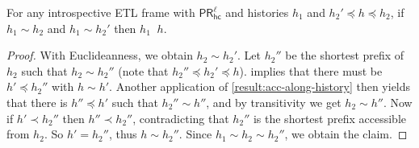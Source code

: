 \documentclass{article}
\newcommand{\PRhcl}{\ensuremath{\mathsf{PR_{hc}^\ell}}\xspace}
\newcommand{\acc}{\sim}
\DeclareMathOperator{\accSfive}{\dot\acc}
\newcounter{#1}
\begin{document}
\begin{lemma}\label{result:flashlight}
  For any introspective ETL frame with \PRhcl and
  histories $h_1$ and $h_2'\preceq h\preceq h_2$, if $h_1\acc h_2$ and $h_1\acc h_2'$
  then $h_1\accSfive h$.
\end{lemma}
\begin{proof}
  With Euclideanness, we obtain $h_2\acc h_2'$.
  Let $h_2''$ be the shortest prefix of $h_2$ such that $h_2\acc h_2''$ (note that $h_2''\preceq h_2'\preceq h$).
   implies that there must be $h'\preceq h_2''$ with $h\acc h'$.
  Another application of \cref{result:acc-along-history} then yields that
  there is $h''\preceq h'$ such that $h_2''\acc h''$,
  and by transitivity we get $h_2\acc h''$.
  Now if $h'\prec h_2''$ then $h''\prec h_2''$,
  contradicting that $h_2''$ is the shortest prefix accessible from $h_2$.
  So $h'=h_2''$, thus $h\acc h_2''$.
  Since $h_1\acc h_2\acc h_2''$, we obtain the claim.
\end{proof}
\end{document}
